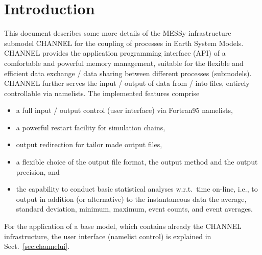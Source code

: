 \documentclass[twoside]{article}
\begin{document}
\newpage
\tableofcontents
\newpage

\section{Introduction}
%
This document describes some more details of the MESSy infrastructure
submodel CHANNEL for the coupling of processes in Earth System Models.
%
CHANNEL provides the application programming interface (API) of a comfortable
and powerful memory management, suitable for the flexible and efficient data
exchange / data sharing between different processes (submodels). CHANNEL
further serves the input / output of data from / into files, entirely
controllable via namelists. The implemented features comprise
\begin{itemize}
 \item a full input / output control (user interface) via Fortran95 namelists,
 \item a powerful restart facility for simulation chains,
 \item output redirection for tailor made output files,
 \item a flexible choice of the output file format, the output method and the
       output precision, and
 \item the capability to conduct basic statistical analyses w.r.t.\ time
       on-line, i.e., to output in addition (or alternative) to the
       instantaneous data the average, standard deviation, minimum, maximum,
       event counts, and event averages.
\end{itemize}
%
For the application of a base model, which contains already the
CHANNEL infrastructure, the user interface (namelist control)
is explained in Sect.~\ref{sec:channelui}.
\end{document}

